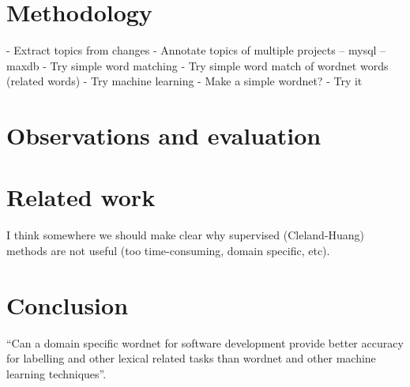 \documentclass[times, 10pt,twocolumn]{article}
\begin{document}
\section{Methodology}
- Extract topics from changes
- Annotate topics of multiple projects
-- mysql
-- maxdb
- Try simple word matching
- Try simple word match of wordnet words (related words)
- Try machine learning
- Make a simple wordnet?
- Try it

\section{Observations and evaluation}

\section{Related work}
I think somewhere we should make clear why supervised
(Cleland-Huang) methods are not useful (too time-consuming, domain
specific, etc).

\section{Conclusion}
``Can a domain specific wordnet for
   software development provide better accuracy for labelling and other
   lexical related tasks than wordnet and other machine learning
   techniques''.




\end{document}
